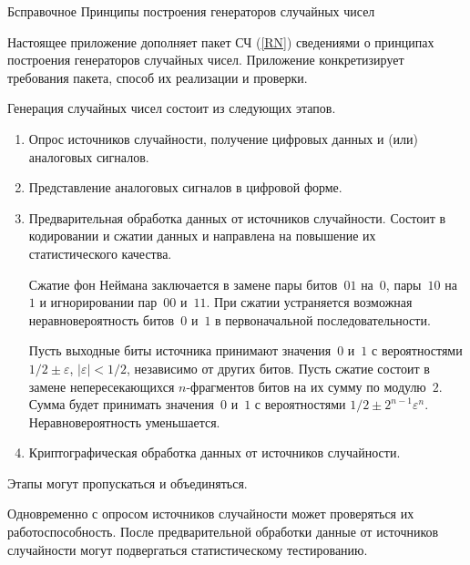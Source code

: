 \begin{appendix}{Б}{справочное}
{Принципы построения генераторов случайных чисел}
\label{RNG} 


Настоящее приложение дополняет пакет СЧ (\ref{RN})
сведениями о принципах построения генераторов случайных чисел. 
%
Приложение конкретизирует требования пакета, способ их реализации и проверки.


Генерация случайных чисел состоит из следующих этапов.

\begin{enumerate}
\item
Опрос источников случайности,
получение цифровых данных и (или) аналоговых сигналов.

\item
Представление аналоговых сигналов в цифровой форме.

\item
Предварительная обработка данных от источников случайности. 
Состоит в кодировании и сжатии данных и направлена на повышение их 
статистического качества. 

\begin{example}
Сжатие фон Неймана заключается в замене пары битов~$01$ на~$0$, пары~$10$ на~$1$ 
и игнорировании пар~$00$ и~$11$. При сжатии устраняется возможная 
неравновероятность битов~$0$ и~$1$ в первоначальной последовательности.
\end{example}

\begin{example}
Пусть выходные биты источника принимают значения~$0$ и~$1$ с вероятностями 
$1/2\pm\varepsilon$, $|\varepsilon|<1/2$, независимо от других битов.
%
Пусть сжатие состоит в замене непересекающихся $n$-фрагментов битов на их сумму 
по модулю~$2$. 
%
Сумма будет принимать значения~$0$ и~$1$ с вероятностями
$1/2\pm 2^{n-1}\varepsilon^n$. Неравновероятность уменьшается.
\end{example}

\item
Криптографическая обработка данных от источников случайности. 
\end{enumerate}

Этапы могут пропускаться и объединяться. 

Одновременно с опросом источников случайности может проверяться их 
работоспособность.
%
После предварительной обработки данные от источников случайности 
могут подвергаться статистическому тестированию. 


\end{appendix}
